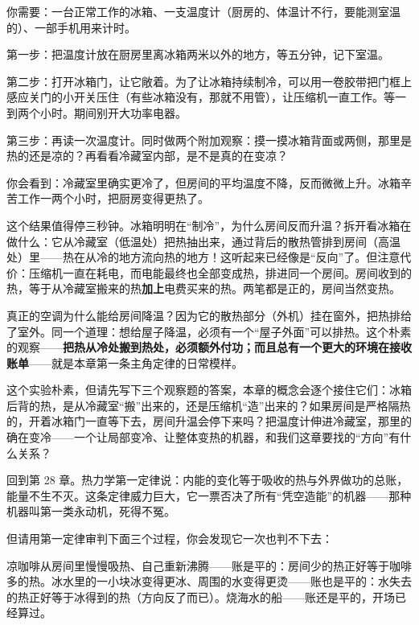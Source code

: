 
\begin{experiment}[开门的冰箱能当空调吗]
你需要：一台正常工作的冰箱、一支温度计（厨房的、体温计不行，要能测室温的）、一部手机用来计时。

第一步：把温度计放在厨房里离冰箱两米以外的地方，等五分钟，记下室温。

第二步：打开冰箱门，让它敞着。为了让冰箱持续制冷，可以用一卷胶带把门框上感应关门的小开关压住（有些冰箱没有，那就不用管），让压缩机一直工作。等一到两个小时。期间别开大功率电器。

第三步：再读一次温度计。同时做两个附加观察：摸一摸冰箱背面或两侧，那里是热的还是凉的？再看看冷藏室内部，是不是真的在变凉？

你会看到：冷藏室里确实更冷了，但房间的平均温度不降，反而微微上升。冰箱辛苦工作一两个小时，把厨房变得更热了。
\end{experiment}

这个结果值得停三秒钟。冰箱明明在“制冷”，为什么房间反而升温？拆开看冰箱在做什么：它从冷藏室（低温处）把热抽出来，通过背后的散热管排到房间（高温处）里——热在从冷的地方流向热的地方！这听起来已经像是“反向”了。但注意代价：压缩机一直在耗电，而电能最终也全部变成热，排进同一个房间。房间收到的热，等于从冷藏室搬来的热\textbf{加上}电费买来的热。两笔都是正的，房间当然变热。

真正的空调为什么能给房间降温？因为它的散热部分（外机）挂在窗外，把热排给了室外。同一个道理：想给屋子降温，必须有一个“屋子外面”可以排热。这个朴素的观察——\textbf{把热从冷处搬到热处，必须额外付功；而且总有一个更大的环境在接收账单}——就是本章第一条主角定律的日常模样。

这个实验朴素，但请先写下三个观察题的答案，本章的概念会逐个接住它们：冰箱后背的热，是从冷藏室“搬”出来的，还是压缩机“造”出来的？如果房间是严格隔热的，开着冰箱门一直等下去，房间升温会停下来吗？把温度计伸进冷藏室，那里的确在变冷——一个让局部变冷、让整体变热的机器，和我们这章要找的“方向”有什么关系？


回到第 28 章。热力学第一定律说：内能的变化等于吸收的热与外界做功的总账，能量不生不灭。这条定律威力巨大，它一票否决了所有“凭空造能”的机器——那种机器叫第一类永动机，死得不冤。

但请用第一定律审判下面三个过程，你会发现它一次也判不下去：

凉咖啡从房间里慢慢吸热、自己重新沸腾——账是平的：房间少的热正好等于咖啡多的热。冰水里的一小块冰变得更冰、周围的水变得更烫——账也是平的：水失去的热正好等于冰得到的热（方向反了而已）。烧海水的船——账还是平的，开场已经算过。

